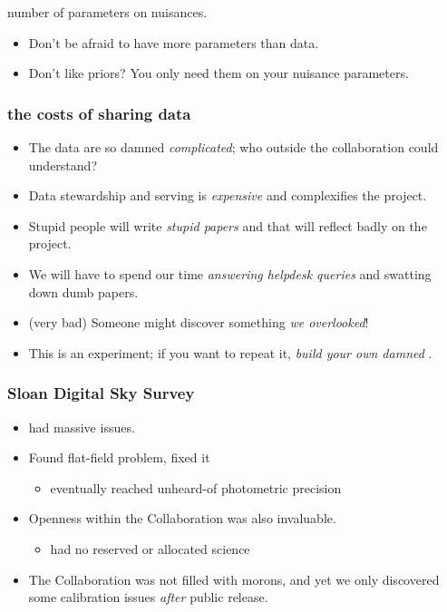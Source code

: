 \documentclass[pdftex]{beamer}
\begin{document}
\begin{frame}
\begin{itemize}
number of parameters on nuisances.
    \begin{itemize}
    \item Don't be afraid to have more parameters than data.
    \item Don't like priors?  You only need them on your nuisance parameters.
    \end{itemize}
  \end{itemize}
\end{frame}

\begin{frame}
  \frametitle{the costs of sharing data}
  \begin{itemize}
  \item The data are so damned \emph{complicated}; who outside the collaboration could understand?
  \item Data stewardship and serving is \emph{expensive} and complexifies the project.
  \item Stupid people will write \emph{stupid papers} and that will reflect badly on the project.
  \item We will have to spend our time \emph{answering helpdesk queries} and swatting down dumb papers.
  \item (very bad) Someone might discover something \emph{we overlooked}!
  \item This is an experiment; if you want to repeat it, \emph{build your own damned }.
  \end{itemize}
\end{frame}

\begin{frame}
  \frametitle{Sloan Digital Sky Survey}
  \begin{itemize}
  \item {} had massive issues.
  \item Found flat-field problem, fixed it
    \begin{itemize}
    \item eventually reached unheard-of photometric precision
    \end{itemize}
  \item Openness within the Collaboration was also invaluable.
    \begin{itemize}
    \item {} had no reserved or allocated science
    \end{itemize}
  \item The Collaboration was not filled with morons, and yet we only
    discovered some calibration issues \emph{after} public release.
  \end{itemize}
\end{frame}
\end{document}
